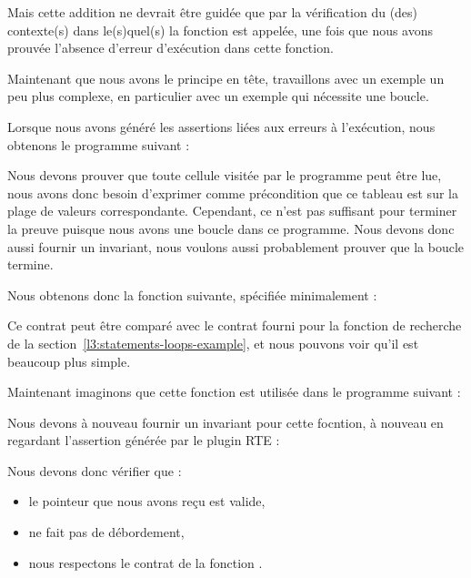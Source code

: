 

Mais cette addition ne devrait être guidée que par la vérification du (des)
contexte(s) dans le(s)quel(s) la fonction est appelée, une fois que nous avons
prouvée l'absence d'erreur d'exécution dans cette fonction.




Maintenant que nous avons le principe en tête, travaillons avec un exemple un peu
plus complexe, en particulier avec un exemple qui nécessite une boucle.




Lorsque nous avons généré les assertions liées aux erreurs à l'exécution, nous
obtenons le programme suivant :




Nous devons prouver que toute cellule visitée par le programme peut être lue,
nous avons donc besoin d'exprimer comme précondition que ce tableau est
 sur la plage de valeurs correspondante.
Cependant, ce n'est pas suffisant pour terminer la preuve puisque nous avons une
boucle dans ce programme. Nous devons donc aussi fournir un invariant, nous
voulons aussi probablement prouver que la boucle termine.


Nous obtenons donc la fonction suivante, spécifiée minimalement :





Ce contrat peut être comparé avec le contrat fourni pour la fonction de recherche
de la section~\ref{l3:statements-loops-example}, et nous pouvons voir qu'il est
beaucoup plus simple.


Maintenant imaginons que cette fonction est utilisée dans le programme suivant :




Nous devons à nouveau fournir un invariant pour cette focntion, à nouveau en
regardant l'assertion générée par le plugin RTE :




Nous devons donc vérifier que :

\begin{itemize}
\item le pointeur que nous avons reçu est valide,
\item {} ne fait pas de débordement,
\item nous respectons le contrat de la fonction .
\end{itemize}


